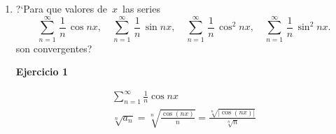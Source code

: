 \documentclass{article}
\begin{document}
\begin{enumerate}
\begin{enumerate}
Como \(\sum a_n\) y \(\sum b_n\) son convergentes, entonces \(\sum c_n\) también lo es. Por lo tanto, \(\sum a_n b_n\) converge por comparación.
\[\]
2.La convergencia de \(\sum a_n\) no siempre implica que \(\sum |a_n|\) converge, pero si \(\sum |a_n|\) converge, entonces \(\sum a_n\) converge absolutamente.
\[\]
3.La convergencia de \(\sum b_n\) no garantiza que \(\sum b_n^2\) sea convergente.
    \item Dar ejemplos de series de la forma \,$\displaystyle\sum_{n\,=\,1}^\infty\,a_n\,b_n$, \,$\displaystyle\sum_{n\,=\,1}^\infty\,|a_n|$, \,$\displaystyle\sum_{n\,=\,1}^\infty\,b_n^2$\, que sean convergentes y las series \,$\displaystyle\sum_{n\,=\,1}^\infty\,a_n$\, y \,$\displaystyle\sum_{n\,=\,1}^\infty\,b_n$\, son divergentes.
\[\]
\begin{enumerate}
    \item Sea \(a_n = \frac{1}{\log n}\) y \(b_n = \frac{1}{\sqrt{n}}\).  
    La serie \(\sum a_n b_n = \sum \frac{1}{\sqrt{n} \log n}\), corroborando la convergencia por el criterio de la integral, se observa que es convergente.
    
    \item Decir que \(\sum \lvert a_n \rvert\) converge, es decir que la serie es absolutamente convergente, por lo que no hay ejemplo para este caso.
    
    \item Sea \(\sum b_n = \sum \frac{1}{n \log n}\).  
    Usando el criterio de la integral, esta serie diverge. Sin embargo, \(\sum b_n^2 = \sum \frac{1}{n^2 \log^2 n}\), al usar el mismo criterio, se observa que la serie converge.
\end{enumerate}

    \end{enumerate}
\newpage
\item ?`Para que valores de \,$x$\, las series
\[
\displaystyle\sum_{n=1}^{\infty}\,\frac{1}{n}\,\cos nx,\quad\displaystyle\sum_{n=1}^{\infty}\,\frac{1}{n}\,\sin nx,\quad\displaystyle\sum_{n=1}^{\infty}\,\frac{1}{n}\,\cos^2 nx,\quad\displaystyle\sum_{n=1}^{\infty}\,\frac{1}{n}\,\sin^2 nx.
\]
son convergentes?

\textbf{Ejercicio 1}

$$
\begin{gathered}
\sum_{n=1}^{\infty} \frac{1}{n} \cos n x \\
\sqrt[n]{a_n}=\sqrt[n]{\frac{\cos (n x)}{n}}=\frac{\sqrt[n]{|\cos (n x)|}}{\sqrt[n]{n}}
\end{gathered}
$$


\end{enumerate}
\end{document}
